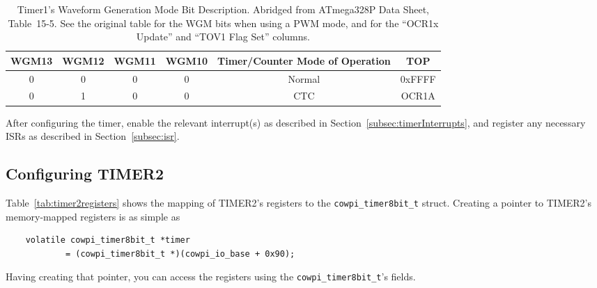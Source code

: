 \begin{table}[h]
    \centering \small
    \begin{tabular}{|c|c|c|c|c|c|} \hline
    \textbf{WGM13}  & \textbf{WGM12}    & \textbf{WGM11}    & \textbf{WGM10}    & \textbf{Timer/Counter Mode of Operation}  & TOP    \\ \hline\hline
    0               & 0                 & 0                 & 0                 & Normal                                    & 0xFFFF \\ \hline
    0               & 1                 & 0                 & 0                 & CTC                                       & OCR1A  \\ \hline
    \end{tabular}
    \caption{Timer1's Waveform Generation Mode Bit Description. \tiny Abridged from ATmega328P Data Sheet, Table~15\mbox{-}5.\cite{ATmega328P} See the original table for the WGM bits when using a PWM mode, and for the ``OCR1x Update'' and ``TOV1 Flag Set'' columns. \label{tab:timer1wgm}}
\end{table}

After configuring the timer, enable the relevant interrupt(s) as described in Section~\ref{subsec:timerInterrupts}, and register any necessary ISRs as described in Section~\ref{subsec:isr}.

\subsection{Configuring TIMER2}
Table~\ref{tab:timer2registers} shows the mapping of TIMER2's registers to the \lstinline{cowpi_timer8bit_t} struct.
Creating a pointer to TIMER2's memory-mapped registers is as simple as
\begin{lstlisting}
    volatile cowpi_timer8bit_t *timer
            = (cowpi_timer8bit_t *)(cowpi_io_base + 0x90);
\end{lstlisting}
Having creating that pointer, you can access the registers using the \lstinline{cowpi_timer8bit_t}'s fields.

